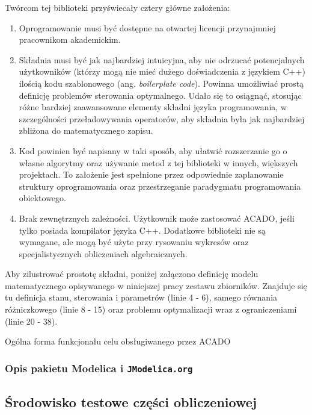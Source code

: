 Twórcom tej biblioteki przyświecały cztery główne założenia:
\begin{enumerate}
    \item Oprogramowanie musi być dostępne na otwartej licencji przynajmniej pracownikom akademickim.
    \item Składnia musi być jak najbardziej intuicyjna, aby nie odrzucać potencjalnych użytkowników (którzy mogą nie mieć dużego doświadczenia z językiem C++) ilością kodu szablonowego (ang. \emph{boilerplate code}). Powinna umożliwiać prostą definicję problemów sterowania optymalnego. Udało się to osiągnąć, stosując różne bardziej zaawansowane elementy składni języka programowania, w szczególności przeładowywania operatorów, aby składnia była jak najbardziej zbliżona do matematycznego zapisu.
    \item Kod powinien być napisany w taki sposób, aby ułatwić rozszerzanie go o własne algorytmy oraz używanie metod z tej biblioteki w innych, większych projektach. To założenie jest spełnione przez odpowiednie zaplanowanie struktury oprogramowania oraz przestrzeganie paradygmatu programowania obiektowego.
    \item Brak zewnętrznych zależności. Użytkownik może zastosować ACADO, jeśli tylko posiada kompilator języka C++. Dodatkowe biblioteki nie są wymagane, ale mogą być użyte przy rysowaniu wykresów oraz specjalistycznych obliczeniach algebraicznych.
\end{enumerate}

Aby zilustrować prostotę składni, poniżej załączono definicję modelu matematycznego opisywanego w niniejszej pracy zestawu zbiorników. Znajduje się tu definicja stanu, sterowania i parametrów (linie 4 - 6), samego równania różniczkowego (linie 8 - 15) oraz problemu optymalizacji wraz z ograniczeniami (linie 20 - 38).


Ogólna forma funkcjonału celu obsługiwanego przez ACADO

\subsubsection{Opis pakietu Modelica i \texttt{JModelica.org}}

\subsection{Środowisko testowe części obliczeniowej}
\label{sub:czesc-wyzsza-docker}

